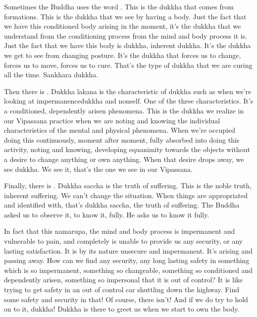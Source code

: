 \documentclass[letterpaper,10pt,english]{sphinxmanual}
\begin{document}
\sphinxAtStartPar
Sometimes  the  Buddha  uses  the  word
.  This  is  the
dukkha  that  comes  from  formations.  This  is  the  dukkha  that  we  see  by
having a body. Just the fact that we have this conditioned body arising in the
moment, it’s the dukkha that we understand from the conditioning process
from the mind and body process it is. Just the fact that we have this body is
dukkha, inherent dukkha. It’s the dukkha we get to see from changing posture. It’s the dukkha that forces us to change, forces us to move, forces us
to cure. That’s the type of dukkha that we are curing all the time. Sankhara
dukkha.

\sphinxAtStartPar
Then  there  is
.  Dukkha  lakana  is  the  characteristic  of
dukkha such as when we’re looking at impermanence\sphinxhyphen{}dukkha and non\sphinxhyphen{}self.
One of the three characteristics. It’s a conditioned, dependently arisen phenomena. This is the dukkha we realize in our Vipassana practice when we are
noting and knowing the individual characteristics of the mental and physical
phenomena.  When  we’re  occupied  doing  this  continuously,  moment  after
moment, fully absorbed into doing this activity, noting and knowing, developing equanimity towards the objects without a desire to change anything or
own anything. When that desire drops away, we see dukkha. We see it, that’s
the one we see in our Vipassana.

\sphinxAtStartPar
Finally, there is
. Dukkha saccha is the truth of suffering. This is the noble truth, inherent suffering. We can’t change the situation.
When things are appropriated and identified with, that’s dukkha saccha, the
truth of suffering. The Buddha asked us to observe it, to know it, fully. He
asks us to know it fully.

\sphinxAtStartPar
In fact that this nama\sphinxhyphen{}rupa, the mind and body process is impermanent
and vulnerable to pain, and completely is unable to provide us any security,
  or  any  lasting  satisfaction.  It  is  by  its  nature  unsecure  and  impermanent.
It’s arising and passing away. How can we find any security, any long lasting safety in something which is so impermanent, something so changeable,
something so conditioned and dependently arisen, something so impersonal
that  it  is  out  of  control?  It  is  like  trying  to  get  safety  in  an  out  of  control
car shuttling down the highway. Find some safety and security in that! Of
course, there isn’t! And if we do try to hold on to it, dukkha! Dukkha is there
to greet us when we start to own the body.
\end{document}
